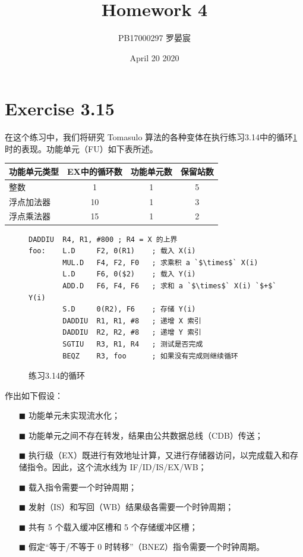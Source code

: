 \documentclass{article}
\title{Homework 4}
\author{PB17000297 罗晏宸}
\date{April 20 2020}
\begin{document}
\maketitle

\section{Exercise 3.15}
在这个练习中，我们将研究 Tomasulo 算法的各种变体在执行练习3.14中的循环\ref{3.14}时的表现。功能单元（FU）如下表所述。
\begin{table}[h]
    \centering
    \begin{tabular}{lccc}
        \toprule
        功能单元类型 & EX中的循环数 & 功能单元数 & 保留站数 \\
        \midrule
        整数         & 1            & 1          & 5        \\
        浮点加法器   & 10           & 1          & 3        \\
        浮点乘法器   & 15           & 1          & 2        \\
        \bottomrule
    \end{tabular}
\end{table}
\begin{figure}[h]
    \label{3.14}
    \centering
    \begin{lstlisting}[firstnumber = 0]
        DADDIU  R4, R1, #800 ; R4 = X 的上界
foo:    L.D     F2, 0(R1)    ; 载入 X(i)
        MUL.D   F4, F2, F0   ; 求乘积 a `$\times$` X(i)
        L.D     F6, 0($2)    ; 载入 Y(i)
        ADD.D   F6, F4, F6   ; 求和 a `$\times$` X(i) `$+$` Y(i)
        S.D     0(R2), F6    ; 存储 Y(i)
        DADDIU  R1, R1, #8   ; 递增 X 索引
        DADDIU  R2, R2, #8   ; 递增 Y 索引
        SGTIU   R3, R1, R4   ; 测试是否完成
        BEQZ    R3, foo      ; 如果没有完成则继续循环
    \end{lstlisting}
    \caption{练习3.14的循环}
\end{figure}
作出如下假设：
\begin{enumerate}[]
    \item[$\blacksquare$] 功能单元未实现流水化；
    \item[$\blacksquare$] 功能单元之间不存在转发，结果由公共数据总线（CDB）传送；
    \item[$\blacksquare$] 执行级（EX）既进行有效地址计算，又进行存储器访问，以完成载入和存储指令。因此，这个流水线为 IF/ID/IS/EX/WB；
    \item[$\blacksquare$] 载入指令需要一个时钟周期；
    \item[$\blacksquare$] 发射（IS）和写回（WB）结果级各需要一个时钟周期；
    \item[$\blacksquare$] 共有 5 个载入缓冲区槽和 5 个存储缓冲区槽；
    \item[$\blacksquare$] 假定“等于/不等于 0 时转移”（BNEZ）指令需要一个时钟周期。
\end{enumerate}
\end{document}
